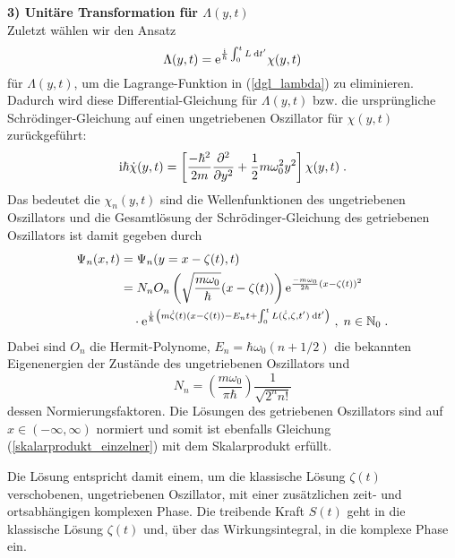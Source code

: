       \textbf{3) Unitäre Transformation für $\Lambda(y,t)$}\\
      Zuletzt wählen wir den Ansatz
      \begin{equation}
        \Lambda(y,t) = \text e^{\frac{\text i}{\hbar}\int_0^tL \: \text d t'}\chi(y,t)
      \end{equation}
      für $\Lambda(y,t)$, um die Lagrange-Funktion in (\ref{dgl_lambda}) zu eliminieren.
      Dadurch wird diese Differential-Gleichung für $\Lambda(y,t)$ bzw. die ursprüngliche Schrödinger-Gleichung auf einen ungetriebenen Oszillator für $\chi(y,t)$ zurückgeführt:
      \begin{equation}
        \text i \hbar \dot \chi(y,t) = \left[ \frac{-\hbar^2}{2m}\frac{\partial^2}{\partial y^2} + \frac{1}{2}m\omega_0^2y^2 \right]\chi(y,t) \; .
      \end{equation}
      Das bedeutet die $\chi_n(y,t)$ sind die Wellenfunktionen des ungetriebenen Oszillators und die Gesamtlösung der Schrödinger-Gleichung des getriebenen Oszillators ist damit gegeben durch
      \begin{align}
        \begin{split}
        \Psi_n(x,t) &= \Psi_n(y=x-\zeta(t),t) \\
        &= N_nO_n\left(\sqrt{\frac{m\omega_0}{\hbar}}(x-\zeta(t))\right) \text e^{\frac{-m\omega_0}{2\hbar}(x-\zeta(t))^2} \\
        &\quad \cdot \text e^{\frac{\text i}{\hbar}\left(m\dot \zeta(t)(x-\zeta(t))-E_nt+\int_0^tL(\dot \zeta,\zeta,t')\:\text dt'\right)} \; ,
        \; n \in \mathbb{N}_0 \; .
        \label{gesamtlsg_einzelner}
      \end{split}
      \end{align}
      Dabei sind $O_n$ die Hermit-Polynome, $E_n = \hbar \omega_0(n+1/2)$ die bekannten Eigenenergien der Zustände des ungetriebenen Oszillators und
      \begin{equation}
        N_n = \left(\frac{m\omega_0}{\pi \hbar}\right) \frac{1}{\sqrt{2^nn!}}
      \end{equation}
      dessen Normierungsfaktoren.
      Die Lösungen des getriebenen Oszillators sind auf $x \in (-\infty, \infty)$ normiert und somit ist ebenfalls Gleichung (\ref{skalarprodukt_einzelner}) mit dem Skalarprodukt erfüllt.

      Die Lösung entspricht damit einem, um die klassische Lösung $\zeta(t)$ verschobenen, ungetriebenen Oszillator, mit einer zusätzlichen zeit- und ortsabhängigen komplexen Phase.
      Die treibende Kraft $S(t)$ geht in die klassische Lösung $\zeta(t)$ und, über das Wirkungsintegral, in die komplexe Phase ein.




